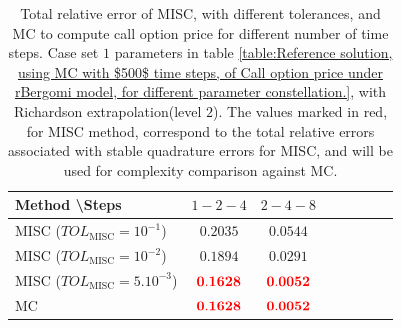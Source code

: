 \FloatBarrier
\begin{table}[!h]
	\centering
	\begin{tabular}{l*{6}{c}r}
		Method \textbackslash  Steps            & $1-2-4$ & $2-4-8$  \\
		\hline
		MISC ($TOL_{\text{MISC}}=10^{-1}$)  & $\mathbf{0.2035
		}$ & $\mathbf{ 0.0544}$ \\
		MISC ($TOL_{\text{MISC}}=10^{-2}$)  & $\mathbf{0.1894}$ & $\mathbf{  0.0291}$   \\	
		MISC ($TOL_{\text{MISC}}=5.10^{-3}$)  & $\mathbf{{\color{red}0.1628}}$ & $\mathbf{{\color{red}0.0052}}$   \\
		\hline
		MC   & $\mathbf{{\color{red}0.1628}}$  & $\mathbf{{\color{red}0.0052}}$    \\
		\hline
	\end{tabular}
	\caption{Total  relative error of MISC, with different tolerances, and MC to compute call option price for different number of time steps. Case set $1$ parameters in table \ref{table:Reference solution, using MC with $500$ time steps, of Call option price under rBergomi model, for different parameter constellation.}, with Richardson extrapolation(level $2$). The values marked in red, for MISC method, correspond to the total relative errors associated with  stable quadrature errors for MISC, and will be used for complexity comparison against MC.}
	\label{Total  error of MISC and MC to compute Call option price of the different tolerances for different number of time steps. Case set $1$ parameters, with Richardson extrapolation(level $2$). The numbers between parentheses are the corresponding absolute errors.}
\end{table}

\FloatBarrier

